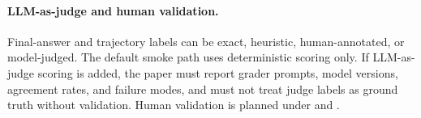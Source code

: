\paragraph{LLM-as-judge and human validation.}
Final-answer and trajectory labels can be exact, heuristic, human-annotated, or model-judged. The default \benchmark smoke path uses deterministic scoring only. If LLM-as-judge scoring is added, the paper must report grader prompts, model versions, agreement rates, and failure modes, and must not treat judge labels as ground truth without validation. Human validation is planned under  and .
